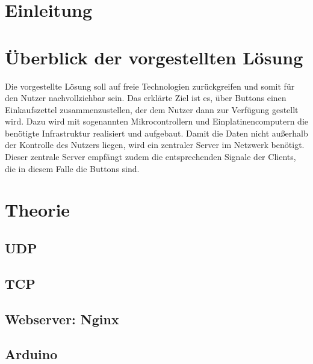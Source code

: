 \documentclass[ngerman]{scrartcl} %
\begin{document}
\tableofcontents
\newpage
 
\section{Einleitung}        
\label{sec:Einleitung-1}   

    

\newpage

\section{Überblick der vorgestellten Lösung}
\label{sec:Überblick der vorgestellten Lösung-1}
Die vorgestellte Lösung soll auf freie Technologien zurückgreifen und somit für den Nutzer nachvollziehbar sein. Das erklärte Ziel ist es, über Buttons einen Einkaufszettel zusammenzustellen, der dem Nutzer dann zur Verfügung gestellt wird. Dazu wird mit sogenannten Mikrocontrollern und Einplatinencomputern die benötigte Infrastruktur realisiert und aufgebaut. Damit die Daten nicht außerhalb der Kontrolle des Nutzers liegen, wird ein zentraler Server im Netzwerk benötigt. Dieser zentrale Server empfängt zudem die entsprechenden Signale der Clients, die in diesem Falle die Buttons sind. 

\newpage

\section{Theorie}        
\label{sec:Theorie-1}  

\subsection{UDP}
\label{sec:UDP-1}



\subsection{TCP}
\label{sec:TCP-1}



\subsection{Webserver: Nginx}
\label{sec:Webserver: Nginx-1} 
 
\subsection{Arduino}
\label{sec:Arduino-1} 
\end{document}
